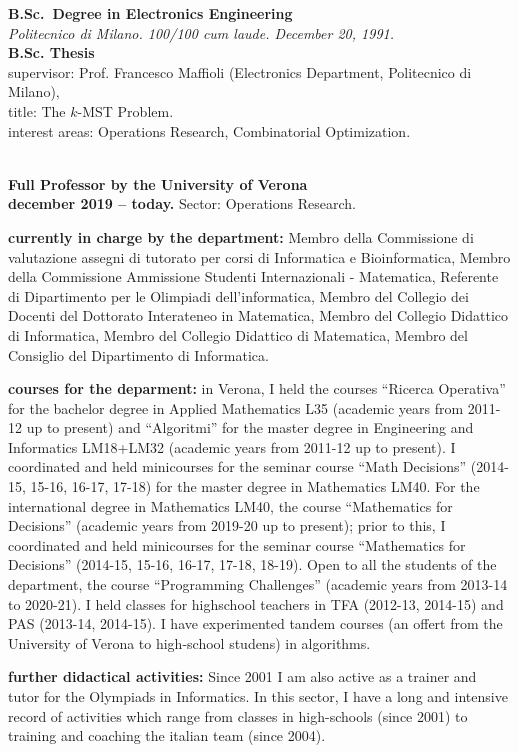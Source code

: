 \documentclass[10pt]{article}
\newcommand{\voice}[1] { \bigskip \medskip \noindent {\Large \bf #1} \medskip\\ }
\newcommand{\subvoice}[1] { {\large \bf #1} \smallskip\\ }
\newcommand{\emp}[1] { {\em #1}\\ }
\begin{document}
\subvoice{B.Sc.~Degree in Electronics Engineering}
\emp{Politecnico di Milano. 100/100 cum laude. December 20, 1991.}

\subvoice{B.Sc. Thesis}
{\sc supervisor:} Prof. Francesco Maffioli (Electronics Department,   
                Politecnico di Milano), \\
{\sc title:} The $k$-MST Problem.\\
{\sc interest areas:} Operations Research, Combinatorial Optimization.\\


\vspace{1.8mm}

\voice{{\LARGE Present employment}}

\subvoice{Full Professor by the
          University of Verona}
{\bf december 2019 -- today.}
Sector: Operations Research.

{\bf currently in charge by the department:} Membro della Commissione di valutazione assegni di tutorato per corsi di Informatica e Bioinformatica, Membro della Commissione Ammissione Studenti
Internazionali - Matematica, Referente di Dipartimento per le Olimpiadi dell'informatica, Membro del Collegio dei Docenti del Dottorato Interateneo in Matematica, Membro del Collegio Didattico di Informatica, Membro del Collegio Didattico di Matematica, Membro del Consiglio del Dipartimento di Informatica.

{\bf courses for the deparment:} in Verona,
I held the courses ``Ricerca Operativa''
for the bachelor degree in Applied Mathematics L35 (academic years from 2011-12 up to present)
and ``Algoritmi'' for the master degree in Engineering and Informatics LM18+LM32 (academic years from 2011-12 up to present).
I coordinated and held minicourses for the seminar course ``Math Decisions'' (2014-15, 15-16, 16-17, 17-18) for the master degree in Mathematics LM40. 
For the international degree in Mathematics LM40, the course ``Mathematics for Decisions'' (academic years from 2019-20 up to present); prior to this, I coordinated and held minicourses for the seminar course ``Mathematics for Decisions'' (2014-15, 15-16, 16-17, 17-18, 18-19).
Open to all the students of the department, the course ``Programming Challenges'' (academic years from 2013-14 to 2020-21).
I held classes for highschool teachers in TFA (2012-13, 2014-15) and PAS (2013-14, 2014-15).
I have experimented tandem courses (an offert from the University of Verona to high-school studens) in algorithms.

{\bf further didactical activities:}
Since 2001 I am also active as a trainer and tutor for the Olympiads in Informatics.
In this sector, I have a long and intensive record of activities
which range from classes in high-schools (since 2001) to training and coaching
the italian team (since 2004).\\
\end{document}
